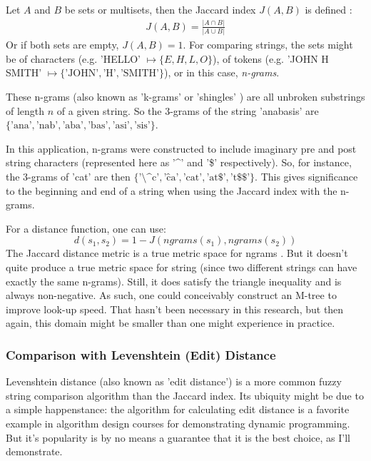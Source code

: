 \documentclass[11pt]{article}
\begin{document}
Let $A$ and $B$ be sets or multisets, then the Jaccard index $J(A,B)$ is defined \cite{mining, comparison}:
\begin{align*}
    J(A, B) = \frac{\left| A \cap B \right|}{\left| A \cup B \right|}
\end{align*}
Or if both sets are empty, $J(A,B) = 1$.
For comparing strings, the sets might be of characters (e.g. 'HELLO' $\mapsto \{E, H, L, O\}$), 
of tokens (e.g. 'JOHN H SMITH' $\mapsto \{\text{'JOHN'}, \text{'H'}, \text{'SMITH'}\}$),
or in this case, {\em n-grams}.

These n-grams (also known as 'k-grams' or 'shingles' \cite{mining}) are all unbroken substrings of 
length $n$ of a given string. So the 3-grams of the string 'anabasis' are 
$\{\text{'ana'}, \text{'nab'}, \text{'aba'}, \text{'bas'}, \text{'asi'}, \text{'sis'}\}$. 

In this application, n-grams were constructed to include imaginary pre and post string characters
(represented here as '\^{}' and '\$' respectively). So, for instance, the 3-grams of 'cat' are then
$\{\text{'\^{}\^{}c'}, \text{'\^{}ca'}, \text{'cat'}, \text{'at\$'}, \text{'t\$\$'}\}$. This gives
significance to the beginning and end of a string when using the Jaccard index with the n-grams.

For a distance function, one can use:
\[d(s_1,s_2) = 1-J(ngrams(s_1),ngrams(s_2))\]
The Jaccard distance metric is a true metric space for ngrams \cite{data_mining}.
But it doesn't quite produce a true metric space for string
(since two different strings can have exactly the same n-grams). Still, it does satisfy
the triangle inequality \cite{general} and is always non-negative. As such, one could
conceivably construct an M-tree \cite{mtree} to improve look-up speed. 
That hasn't been necessary in this research, but then again, this domain might be smaller
than one might experience in practice.

\subsubsection{Comparison with Levenshtein (Edit) Distance}
Levenshtein distance (also known as 'edit distance') is a more common fuzzy string comparison algorithm
than the Jaccard index. 
Its ubiquity might be due to a simple happenstance: the algorithm for calculating edit distance is
a favorite example in algorithm design courses for demonstrating dynamic programming.
But it's popularity is by no means a guarantee that it is the best choice, as I'll demonstrate.
\end{document}

